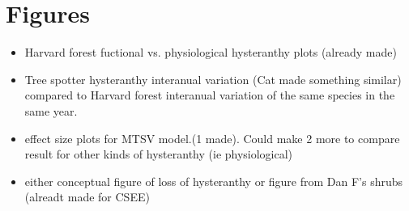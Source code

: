 \documentclass{article}\usepackage[]{graphicx}\usepackage[]{color}
\begin{document}
\section*{Figures}
\begin{itemize}
\item Harvard forest fuctional vs. physiological hysteranthy plots (already made)
\item Tree spotter hysteranthy interanual variation (Cat made something similar) compared to Harvard forest interanual variation of the same species in the same year.
\item effect size plots for MTSV model.(1 made). Could make 2 more to compare result for other kinds of hysteranthy (ie physiological)
\item either conceptual figure of loss of hysteranthy or figure from Dan F's shrubs (alreadt made for CSEE)
\end{itemize}
\end{document}
